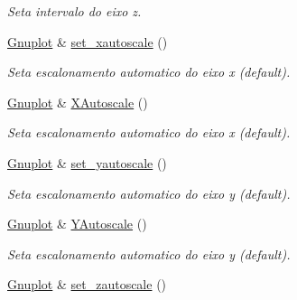 \begin{DoxyCompactItemize}
\begin{DoxyCompactList}\small\item\em Seta intervalo do eixo z. \end{DoxyCompactList}\item 
\hypertarget{classGnuplot_a453688dc2eb979f842082290f3c02ac3}{\hyperlink{classGnuplot}{Gnuplot} \& \hyperlink{classGnuplot_a453688dc2eb979f842082290f3c02ac3}{set\-\_\-xautoscale} ()}\label{classGnuplot_a453688dc2eb979f842082290f3c02ac3}

\begin{DoxyCompactList}\small\item\em Seta escalonamento automatico do eixo x (default). \end{DoxyCompactList}\item 
\hypertarget{classGnuplot_a4260baaa8fa1c269dd6eec31dcada605}{\hyperlink{classGnuplot}{Gnuplot} \& \hyperlink{classGnuplot_a4260baaa8fa1c269dd6eec31dcada605}{X\-Autoscale} ()}\label{classGnuplot_a4260baaa8fa1c269dd6eec31dcada605}

\begin{DoxyCompactList}\small\item\em Seta escalonamento automatico do eixo x (default). \end{DoxyCompactList}\item 
\hypertarget{classGnuplot_a3cc19dba32bb2d3ac59494ae1493faa7}{\hyperlink{classGnuplot}{Gnuplot} \& \hyperlink{classGnuplot_a3cc19dba32bb2d3ac59494ae1493faa7}{set\-\_\-yautoscale} ()}\label{classGnuplot_a3cc19dba32bb2d3ac59494ae1493faa7}

\begin{DoxyCompactList}\small\item\em Seta escalonamento automatico do eixo y (default). \end{DoxyCompactList}\item 
\hypertarget{classGnuplot_a288c0be86e20ff6986f5b43cb69b2bb0}{\hyperlink{classGnuplot}{Gnuplot} \& \hyperlink{classGnuplot_a288c0be86e20ff6986f5b43cb69b2bb0}{Y\-Autoscale} ()}\label{classGnuplot_a288c0be86e20ff6986f5b43cb69b2bb0}

\begin{DoxyCompactList}\small\item\em Seta escalonamento automatico do eixo y (default). \end{DoxyCompactList}\item 
\hypertarget{classGnuplot_ad72aa208fad039b6b7d13ea9595ce157}{\hyperlink{classGnuplot}{Gnuplot} \& \hyperlink{classGnuplot_ad72aa208fad039b6b7d13ea9595ce157}{set\-\_\-zautoscale} ()}\label{classGnuplot_ad72aa208fad039b6b7d13ea9595ce157}


\end{DoxyCompactItemize}
